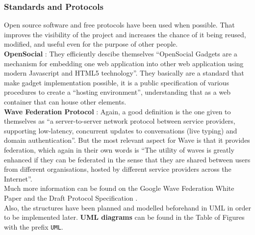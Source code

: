 \subsubsection{Standards and Protocols}
Open source software and free protocols have been used when possible. That improves the visibility of the project and increases the chance of it being reused, modified, and useful even for the purpose of other people.\\[.2cm]
\textbf{OpenSocial} \cite{ref:opensocial}: They efficiently descibe themselves ``OpenSocial Gadgets are a mechanism for embedding one web application into other web application using modern Javascript and HTML5 technology''. They basically are a standard that make gadget implementation possible, it is a public specification of various procedures to create a ``hosting environment'', understanding that as a web container that can house other elements.\\[.2cm]
\textbf{Wave Federation Protocol} \cite{ref:wave_federation_protocol}: Again, a good definition is the one given to themselves as ``a server-to-server network protocol between service providers, supporting low-latency, concurrent updates to conversations (live typing) and domain authentication''. But the most relevant aspect for Wave is that it provides federation, which again in their own words is ``The utility of waves is greatly enhanced if they can be federated in the sense that they are shared between users from different organisations, hosted by different service providers across the Internet''.\\[.2cm]
Much more information can be found on the Google Wave Federation White Paper \cite{ref:wave_white_paper} and the Draft Protocol Specification \cite{ref:wave_over_xmpp}.\\[.2cm]
Also, the structures have been planned and modelled beforehand in UML \cite{ref:uml} in order to be implemented later. \textbf{UML diagrams} can be found in the Table of Figures with the prefix \verb|UML|.
